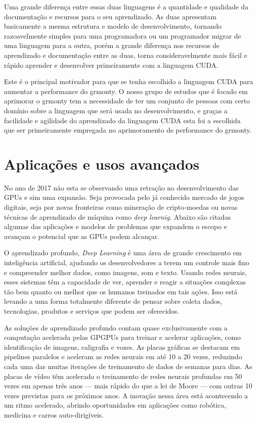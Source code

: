   Uma grande diferença entre essas duas linguagens é a quantidade e qualidade da documentação e recursos para o seu aprendizado. As duas apresentam basicamente a mesma estrutura e modelo de desenvolvimento, tornando razoavelmente simples para uma programadora ou um programador migrar de uma linguagem para a outra, porém a grande diferença nos recursos de aprendizado e documentação entre as duas, torna consideravelmente mais fácil e rápido aprender e desenvolver primeiramente com a linguagem CUDA.

  Este é o principal motivador para que se tenha escolhido a linguagem CUDA para aumentar a performance do grmonty. O nosso grupo de estudos que é focado em aprimorar o grmonty tem a necessidade de ter um conjunto de pessoas com certo domínio sobre a linguagem que será usada no desenvolvimento, e graças a facilidade e agilidade do aprendizado da linguagem CUDA esta foi a escolhida que ser primeiramente empregada no aprimoramento de performance do grmonty.

\section{Aplicações e usos avançados}

  No ano de 2017 não esta se observando uma retração no desenvolvimento das GPUs e sim uma expansão. Seja provocada pelo já conhecido mercado de jogos digitais, seja por novas fronteiras como mineração de cripto-moedas ou novas técnicas de aprendizado de máquina como \textit{deep learnig}. Abaixo são citadas algumas das aplicações e modelos de problemas que expandem o escopo e avançam o potencial que as GPUs podem alcançar.

  O aprendizado profundo, \textit{Deep Learning} é uma área de grande crescimento em inteligência artificial, ajudando os desenvolvedores a terem um controle mais fino e compreender melhor dados, como imagens, som e texto. Usando redes neurais, esses sistemas têm a capacidade de ver, aprender e reagir a situações complexas tão bem quanto ou melhor que os humanos treinados em tais ações. Isso está levando a uma forma totalmente diferente de pensar sobre coleta dados, tecnologias, produtos e serviços que podem ser oferecidos.

  As soluções de aprendizado profundo contam quase exclusivamente com a computação acelerada pelas GPGPUs para treinar e acelerar aplicações, como identificação de imagens, caligrafia e vozes. As placas gráficas se destacam em pipelines paralelos e aceleram as redes neurais em até 10 a 20 vezes, reduzindo cada uma das muitas iterações de treinamento de dados de semanas para dias. As placas de vídeo têm acelerado o treinamento de redes neurais profundas em 50 vezes em apenas três anos — mais rápido do que a lei de Moore — com outras 10 vezes previstas para os próximos anos. A inovação nessa área está acontecendo a um ritmo acelerado, abrindo oportunidades em aplicações como robótica, medicina e carros auto-dirigíveis.


